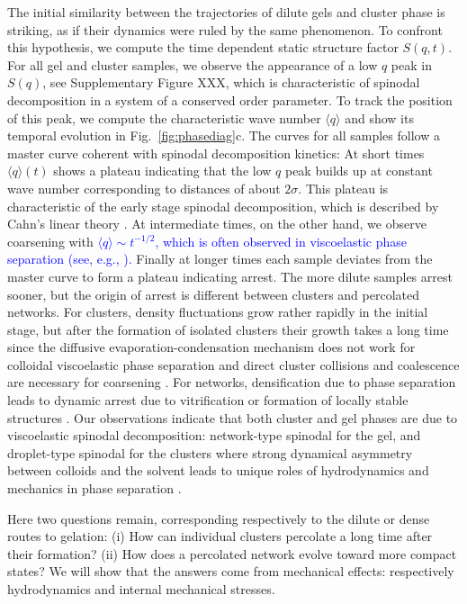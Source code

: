 \documentclass[preprint,footinbib,amsmath,amssymb]{revtex4}
\begin{document}
The initial similarity between the trajectories of dilute gels and cluster phase is striking, as if their dynamics were ruled by the same phenomenon. To confront this hypothesis, we compute the time dependent static structure factor $S(q,t)$. For all gel and cluster samples, we observe the appearance of a low $q$ peak in $S(q)$, see Supplementary Figure XXX, which is characteristic of spinodal decomposition in a system of a conserved order parameter. To track the position of this peak, we compute the characteristic wave number $\langle q \rangle$ and show its temporal evolution in Fig.~\ref{fig:phasediag}c. The curves for all samples follow a master curve coherent with spinodal decomposition kinetics: At short times $\langle q \rangle(t)$ shows a plateau indicating that the low $q$ peak builds up at constant wave number corresponding to distances of about $2\sigma$. This plateau is characteristic of the early stage spinodal decomposition, which is described by Cahn's linear theory \cite{onuki2002phase}. At intermediate times, on the other hand, we observe coarsening with \textcolor{blue}{$\langle q \rangle \sim t^{-1/2}$, which is often observed in viscoelastic phase separation 
(see, e.g., \cite{Furukawa2010}).} Finally at longer times each sample deviates from the master curve to form a plateau indicating arrest. The more dilute samples arrest sooner, 
but the origin of arrest is different between clusters and percolated networks. For clusters, density fluctuations grow rather rapidly in the initial stage, but after the formation of isolated clusters their growth takes a long time since the diffusive evaporation-condensation mechanism does not work for colloidal viscoelastic phase separation and direct cluster collisions and coalescence are necessary for coarsening \cite{tanaka2000viscoelastic}. For networks, densification due to phase separation leads to dynamic arrest due to vitrification \cite{piazza1994phase,verhaegh1997,tanaka1999colloid,poon2002,zaccarelli2007,lu2008gelation} or formation of locally stable structures \cite{royall2008g}. 
Our observations indicate that both cluster and gel phases are due to viscoelastic spinodal decomposition: network-type spinodal for the gel, and droplet-type spinodal for the clusters where strong dynamical asymmetry between colloids and the solvent leads to unique roles of hydrodynamics and mechanics in phase separation \cite{tanaka1999colloid,tanaka2000viscoelastic}.

Here two questions remain, corresponding respectively to the dilute or dense routes to gelation: (i) How can individual clusters percolate a long time after their formation? (ii) How does a percolated network evolve toward more compact states? We will show that the answers come from mechanical effects: respectively hydrodynamics and internal mechanical stresses.
\end{document}
